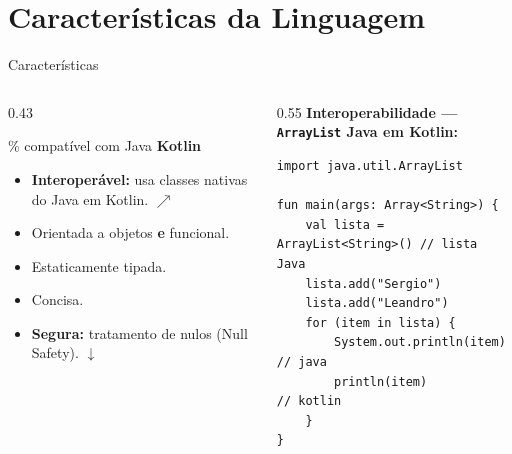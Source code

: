 \documentclass[aspectratio=169]{beamer}
\begin{document}
\section{Características da Linguagem}

\begin{frame}[fragile,shrink=5]{Características}

  \begin{columns}[T]

    \begin{column}{0.43\textwidth}

      \begin{block}{\% compatível com Java}
        \centering
        {\color{kotlinpurple}\textbf{\large Kotlin}} 
      \end{block}

      \vspace{0.2em}
      \begin{itemize}\footnotesize
        \item \textbf{Interoperável:} usa classes nativas do Java em Kotlin. {\tiny $\nearrow$}
        \item Orientada a objetos \textbf{e} funcional.
        \item Estaticamente tipada.
        \item Concisa.
        \item \textbf{Segura:} tratamento de nulos (Null Safety). {\tiny $\downarrow$}
      \end{itemize}
    \end{column}

    \begin{column}{0.55\textwidth}
      {\footnotesize\textbf{Interoperabilidade — \texttt{ArrayList} Java em Kotlin:}}
      \vspace{0.1em}

\begin{lstlisting}[style=KotlinStyle]
import java.util.ArrayList

fun main(args: Array<String>) {
    val lista = ArrayList<String>() // lista Java
    lista.add("Sergio")
    lista.add("Leandro")
    for (item in lista) {
        System.out.println(item) // java
        println(item)            // kotlin
    }
}
\end{lstlisting}
    \end{column}


\end{columns}
\end{frame}
\end{document}
